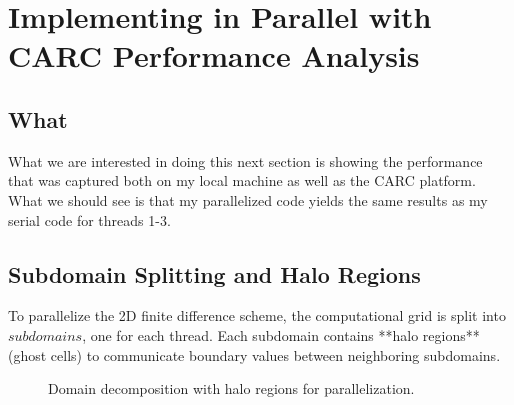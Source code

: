 \documentclass[12pt]{article}
\begin{document}
\section{Implementing in Parallel with CARC Performance Analysis}
\subsection{What}
What we are interested in doing this next section is showing the performance that was captured both on my local machine as well as the CARC platform. What we should see is that my parallelized code yields the same results as my serial code for threads 1-3.

\subsection{Subdomain Splitting and Halo Regions}
To parallelize the 2D finite difference scheme, the computational grid is split into $\textit{subdomains}$, one for each thread. Each subdomain contains **halo regions** (ghost cells) to communicate boundary values between neighboring subdomains.










\begin{figure}[H]
  \centering
    \caption{Domain decomposition with halo regions for parallelization.}
\end{figure}
\end{document}
